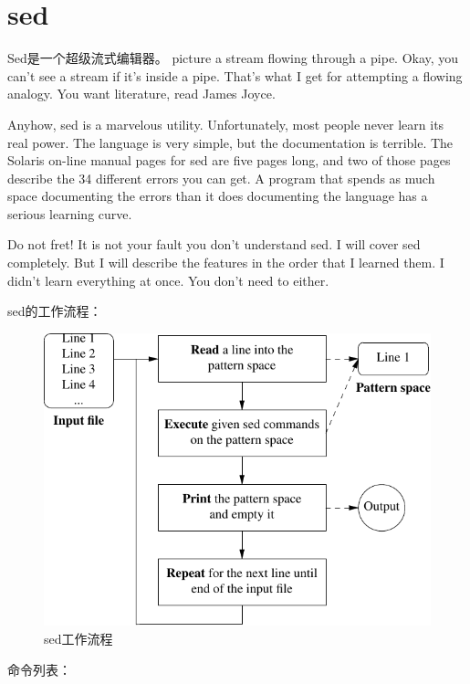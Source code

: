 \chapter{sed}
\label{chap:sed}

Sed是一个超级流式编辑器。
picture a stream flowing through a pipe. Okay, you can't see a stream
if it's inside a pipe. That's what I get for attempting a flowing
analogy. You want literature, read James Joyce.

Anyhow, sed is a marvelous utility. Unfortunately, most people never
learn its real power. The language is very simple, but the
documentation is terrible. The Solaris on-line manual pages for sed
are five pages long, and two of those pages describe the 34 different
errors you can get. A program that spends as much space documenting
the errors than it does documenting the language has a serious
learning curve.

Do not fret! It is not your fault you don't understand sed. I will
cover sed completely. But I will describe the features in the order
that I learned them. I didn't learn everything at once. You don't need
to either.

sed的工作流程：
\begin{figure}[!htbp]
  \centering
  \includegraphics[width=.65\textwidth]{graph/sed_workflow.pdf}
    \caption{sed工作流程}
  \label{fig:sed_workflow}
\end{figure}

命令列表：

